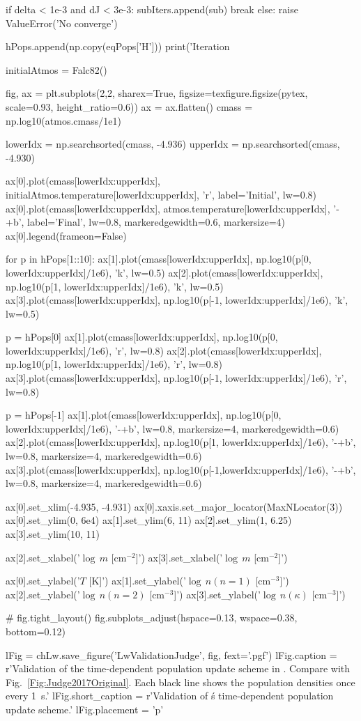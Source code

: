 \begin{pycode}[Lw]
        if delta < 1e-3 and dJ < 3e-3:
            subIters.append(sub)
            break
    else:
        raise ValueError('No converge')

    hPops.append(np.copy(eqPops['H']))
    print('Iteration %


initialAtmos = Falc82()

fig, ax = plt.subplots(2,2, sharex=True, figsize=texfigure.figsize(pytex, scale=0.93, height_ratio=0.6))
ax = ax.flatten()
cmass = np.log10(atmos.cmass/1e1)

lowerIdx = np.searchsorted(cmass, -4.936)
upperIdx = np.searchsorted(cmass, -4.930)

ax[0].plot(cmass[lowerIdx:upperIdx], initialAtmos.temperature[lowerIdx:upperIdx], 'r', label='Initial', lw=0.8)
ax[0].plot(cmass[lowerIdx:upperIdx], atmos.temperature[lowerIdx:upperIdx], '-+b', label='Final', lw=0.8, markeredgewidth=0.6, markersize=4)
ax[0].legend(frameon=False)

for p in hPops[1::10]:
    ax[1].plot(cmass[lowerIdx:upperIdx], np.log10(p[0, lowerIdx:upperIdx]/1e6), 'k', lw=0.5)
    ax[2].plot(cmass[lowerIdx:upperIdx], np.log10(p[1, lowerIdx:upperIdx]/1e6), 'k', lw=0.5)
    ax[3].plot(cmass[lowerIdx:upperIdx], np.log10(p[-1, lowerIdx:upperIdx]/1e6), 'k', lw=0.5)

p = hPops[0]
ax[1].plot(cmass[lowerIdx:upperIdx], np.log10(p[0, lowerIdx:upperIdx]/1e6), 'r', lw=0.8)
ax[2].plot(cmass[lowerIdx:upperIdx], np.log10(p[1, lowerIdx:upperIdx]/1e6), 'r', lw=0.8)
ax[3].plot(cmass[lowerIdx:upperIdx], np.log10(p[-1, lowerIdx:upperIdx]/1e6), 'r', lw=0.8)

p = hPops[-1]
ax[1].plot(cmass[lowerIdx:upperIdx], np.log10(p[0, lowerIdx:upperIdx]/1e6),  '-+b', lw=0.8, markersize=4, markeredgewidth=0.6)
ax[2].plot(cmass[lowerIdx:upperIdx], np.log10(p[1, lowerIdx:upperIdx]/1e6),  '-+b', lw=0.8, markersize=4, markeredgewidth=0.6)
ax[3].plot(cmass[lowerIdx:upperIdx], np.log10(p[-1,lowerIdx:upperIdx]/1e6), '-+b', lw=0.8, markersize=4, markeredgewidth=0.6)

ax[0].set_xlim(-4.935, -4.931)
ax[0].xaxis.set_major_locator(MaxNLocator(3))
ax[0].set_ylim(0, 6e4)
ax[1].set_ylim(6, 11)
ax[2].set_ylim(1, 6.25)
ax[3].set_ylim(10, 11)

ax[2].set_xlabel('$\log\,m$ [cm$^{-2}$]')
ax[3].set_xlabel('$\log\,m$ [cm$^{-2}$]')

ax[0].set_ylabel('$T$ [K]')
ax[1].set_ylabel('$\log\,n(n=1)$ [cm$^{-3}$]')
ax[2].set_ylabel('$\log\,n(n=2)$ [cm$^{-3}$]')
ax[3].set_ylabel('$\log\,n(\kappa)$ [cm$^{-3}$]')

# fig.tight_layout()
fig.subplots_adjust(hspace=0.13, wspace=0.38, bottom=0.12)

lFig = chLw.save_figure('LwValidationJudge', fig, fext='.pgf')
lFig.caption = r'Validation of the time-dependent population update scheme in \Lw{}. Compare with Fig.~\ref{Fig:Judge2017Original}. Each black line shows the population densities once every \SI{1}{\second}.'
lFig.short_caption = r'Validation of \Lw{}\'s time-dependent population update scheme.'
lFig.placement = 'p'
\end{pycode}


